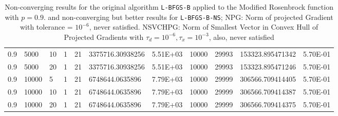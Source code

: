 \begin{table}
\begin{center}
\begin{tabular}{|l|l|l|l|l|l|l|l|l|l|l|}
      0.9 & 5000 & 10 & 1 & 21 & 3375716.30938256 & 5.51E+03 & 10000 & 29993 & 153323.895471342 & 5.70E-01\\
      0.9 & 5000 & 20 & 1 & 21 & 3375716.30938256 & 5.51E+03 & 10000 & 29993 & 153323.895471246 & 5.70E-01\\
      0.9 & 10000 & 5 & 1 & 21 & 6748644.0635896 & 7.79E+03 & 10000 & 29999 & 306566.709414405 & 5.70E-01\\
      0.9 & 10000 & 10 & 1 & 21 & 6748644.0635896 & 7.79E+03 & 10000 & 29999 & 306566.709414387 & 5.70E-01\\
      0.9 & 10000 & 20 & 1 & 21 & 6748644.0635896 & 7.79E+03 & 10000 & 29999 & 306566.709414375 & 5.70E-01\\
      \hline
    \end{tabular}
    \caption[A value where \texttt{L-BFGS-B-NS} is supposed to fail. $p = 0.9$]{Non-converging results for the original algorithm \texttt{L-BFGS-B} applied to the Modified Rosenbrock function with $p = 0.9$.  and non-converging but better results for \texttt{L-BFGS-B-NS}; NPG: Norm of projected Gradient with tolerance = $10^{-6}$, never satisfied. NSVCHPG: Norm of Smallest Vector in Convex Hull of Projected Gradients with $\tau_d = 10^{-6}, \tau_x = 10^{-3}$, also, never satisfied}
    \label{p09}
  \end{center}
\end{table}


\pagebreak
\pagebreak
\clearpage
